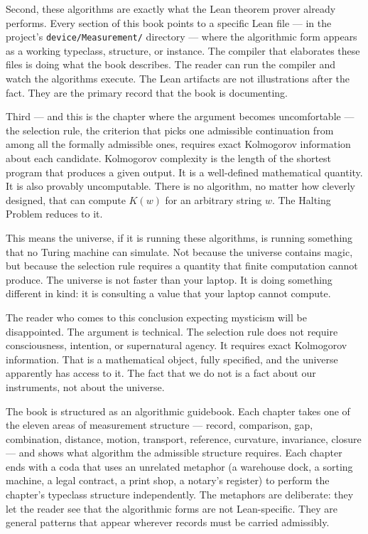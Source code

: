 Second, these algorithms are exactly what the Lean theorem prover already
performs. Every section of this book points to a specific Lean file --- in
the project's \texttt{device/Measurement/} directory --- where the
algorithmic form appears as a working typeclass, structure, or instance.
The compiler that elaborates these files is doing what the book describes.
The reader can run the compiler and watch the algorithms execute. The Lean
artifacts are not illustrations after the fact. They are the primary record
that the book is documenting.

Third --- and this is the chapter where the argument becomes uncomfortable
--- the selection rule, the criterion that picks one admissible
continuation from among all the formally admissible ones, requires exact
Kolmogorov information about each candidate. Kolmogorov complexity is the
length of the shortest program that produces a given output. It is a
well-defined mathematical quantity. It is also provably uncomputable.
There is no algorithm, no matter how cleverly designed, that can compute
$K(w)$ for an arbitrary string $w$. The Halting Problem reduces to it.

This means the universe, if it is running these algorithms, is running
something that no Turing machine can simulate. Not because the universe
contains magic, but because the selection rule requires a quantity that
finite computation cannot produce. The universe is not faster than your
laptop. It is doing something different in kind: it is consulting a value
that your laptop cannot compute.

The reader who comes to this conclusion expecting mysticism will be
disappointed. The argument is technical. The selection rule does not
require consciousness, intention, or supernatural agency. It requires
exact Kolmogorov information. That is a mathematical object, fully
specified, and the universe apparently has access to it. The fact that we
do not is a fact about our instruments, not about the universe.

\bigskip

The book is structured as an algorithmic guidebook. Each chapter takes one
of the eleven areas of measurement structure --- record, comparison, gap,
combination, distance, motion, transport, reference, curvature, invariance,
closure --- and shows what algorithm the admissible structure requires.
Each chapter ends with a coda that uses an unrelated metaphor (a warehouse
dock, a sorting machine, a legal contract, a print shop, a notary's
register) to perform the chapter's typeclass structure independently. The
metaphors are deliberate: they let the reader see that the algorithmic
forms are not Lean-specific. They are general patterns that appear wherever
records must be carried admissibly.

